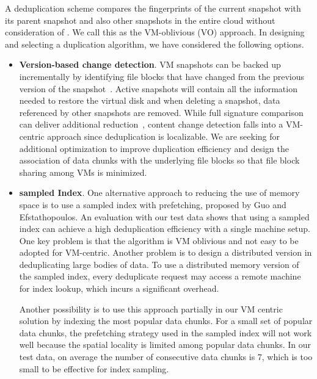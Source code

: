 A deduplication scheme compares the fingerprints of the current snapshot
with its parent snapshot and also other snapshots in the entire cloud without consideration of .
We call this as  the VM-oblivious (VO) approach.
In designing and selecting a duplication algorithm, we have considered the following options.
\begin{itemize}
\item {\bf Version-based change detection}.
VM snapshots can be  backed up  incrementally by identifying file  blocks that have
changed from the previous version of the snapshot~\cite{Clements2009,Vrable2009,TanIPDPS2011}.
Active snapshots will contain all the information needed to restore the virtual disk
and when deleting a snapshot, data referenced by other snapshots are removed.
While full signature comparison can deliver additional reduction~\cite{Guo2011,Dong,ExtremeBining},
content change detection falls into a VM-centric approach since deduplication is localizable. 
We are seeking for additional optimization to improve duplication efficiency and design the 
association of data chunks with the underlying file blocks so that
file block sharing among VMs is minimized.
\item {\bf sampled Index}.
One alternative approach to reducing the use of memory space is 
to use a sampled index with prefetching, proposed  by Guo and Efstathopoulos\cite{Guo2011}. 
An evaluation with our test data shows that using a sampled index can achieve a high
deduplication efficiency with a single machine setup.  
One key problem is that the algorithm is VM oblivious and not easy to be adopted for VM-centric.
Another problem is  to design a distributed version 
in deduplicating large bodies of data. 
To use a distributed memory version of the sampled index, every deduplicate request
may access a remote machine for index lookup,  which  incurs a significant overhead.


Another possibility is to use this approach partially  in our VM centric solution by indexing
the most popular data chunks. For a small set of popular data chunks, the prefetching strategy
used in the sampled index will not work well because the spatial locality is limited among popular 
data chunks. In our test data,  on average the number of consecutive data chunks is 7, which is too small
to be effective for index sampling. 


\end{itemize}
